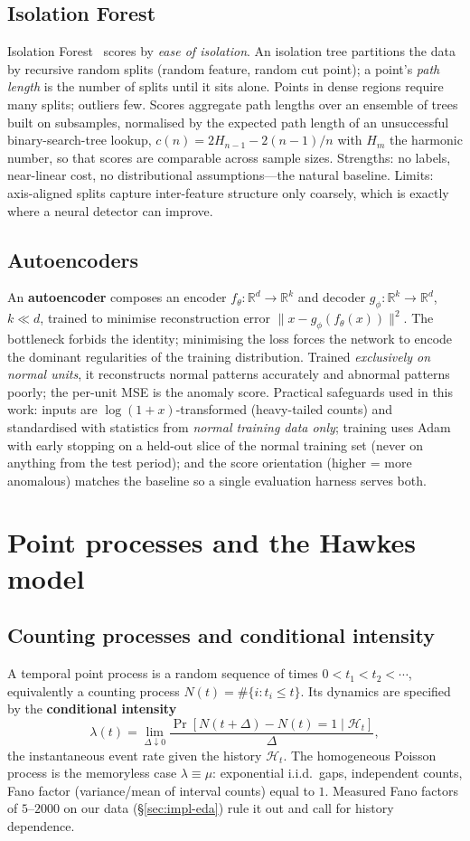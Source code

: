 \documentclass[11pt,a4paper]{report}
\newcommand{\keyword}[1]{\textbf{\color{accent2}#1}}
\begin{document}
\subsection{Isolation Forest}
Isolation Forest~\cite{iforest} scores by \emph{ease of isolation}. An
isolation tree partitions the data by recursive random splits (random
feature, random cut point); a point's \emph{path length} is the number of
splits until it sits alone. Points in dense regions require many splits;
outliers few. Scores aggregate path lengths over an ensemble of trees built
on subsamples, normalised by the expected path length of an unsuccessful
binary-search-tree lookup, $c(n)=2H_{n-1}-2(n{-}1)/n$ with
$H_m$ the harmonic number, so that scores are comparable across sample
sizes. Strengths: no labels, near-linear cost, no distributional
assumptions---the natural baseline. Limits: axis-aligned splits capture
inter-feature structure only coarsely, which is exactly where a neural
detector can improve.

\subsection{Autoencoders}
An \keyword{autoencoder} composes an encoder
$f_\theta:\mathbb{R}^d\!\to\!\mathbb{R}^k$ and decoder
$g_\phi:\mathbb{R}^k\!\to\!\mathbb{R}^d$, $k\ll d$, trained to minimise
reconstruction error $\lVert x-g_\phi(f_\theta(x))\rVert^2$. The bottleneck
forbids the identity; minimising the loss forces the network to encode the
dominant regularities of the training distribution. Trained
\emph{exclusively on normal units}, it reconstructs normal patterns
accurately and abnormal patterns poorly; the per-unit MSE is the anomaly
score. Practical safeguards used in this work: inputs are
$\log(1{+}x)$-transformed (heavy-tailed counts) and standardised with
statistics from \emph{normal training data only}; training uses Adam with
early stopping on a held-out slice of the normal training set (never on
anything from the test period); and the score orientation (higher = more
anomalous) matches the baseline so a single evaluation harness serves both.

\section{Point processes and the Hawkes model}
\label{sec:theory-hawkes}

\subsection{Counting processes and conditional intensity}
A temporal point process is a random sequence of times
$0<t_1<t_2<\cdots$, equivalently a counting process
$N(t)=\#\{i:t_i\le t\}$. Its dynamics are specified by the
\keyword{conditional intensity}
\[
\lambda(t)=\lim_{\Delta\downarrow0}
\frac{\Pr[N(t{+}\Delta)-N(t)=1\mid\mathcal{H}_t]}{\Delta},
\]
the instantaneous event rate given the history $\mathcal{H}_t$. The
homogeneous Poisson process is the memoryless case
$\lambda\equiv\mu$: exponential i.i.d.\ gaps, independent counts, Fano
factor (variance/mean of interval counts) equal to $1$. Measured Fano
factors of $5$--$2000$ on our data (\S\ref{sec:impl-eda}) rule it out and
call for history dependence.
\end{document}
